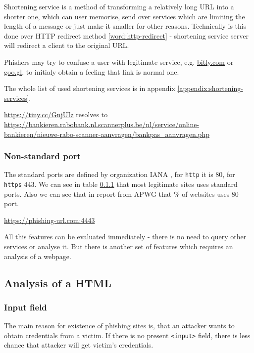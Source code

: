 \documentclass[
  digital, %
  oneside, %
  table,   %
  nolof,     %
  nolot,     %
]{fithesis3}
\newcounter{feature}
\newenvironment{feature}[1]{\stepcounter{feature}%
    \tcolorbox[beamer,%
    noparskip,breakable,
    colback=LightBlue,colframe=DarkBlue,%
    colbacklower=DarkBlue!75!LightBlue,%
    title=Feature~\thefeature: #1]}%
    {\endtcolorbox}
\begin{document}
Shortening service is a method of transforming a relatively long URL into a shorter one, which can user memorise, send over services which are limiting the length of a message or just make it smaller for other reasons. Technically is this done over HTTP redirect method \ref{word:http-redirect} - shortening service server will redirect a client to the original URL.

Phishers may try to confuse a user with legitimate service, e.g. \url{bitly.com} or \url{goo.gl}, to initialy obtain a feeling that link is normal one.

The whole list of used shortening services is in appendix \ref{appendix:shortening-services}.

\begin{feature}{Shortening service}
\url{https://tiny.cc/GnjUIz} \medbreak resolves to \\
\url{https://bankieren.rabobank.nl.scannerplus.be/nl/service/online-bankieren/nieuwe-rabo-scanner-aanvragen/bankpas_aanvragen.php}
\end{feature}

\subsubsection{Non-standard port \cite{fresh-phish}}

The standard ports are defined by organization IANA \cite{https://www.iana.org/assignments/service-names-port-numbers/service-names-port-numbers.txt}, for \texttt{http} it is 80, for \texttt{https} 443. We can see in table \ref{} that most legitimate sites uses standard ports. Also we can see that in report from APWG \cite{some-apwg} that \% of websites uses 80 port.

\begin{feature}{Non-standard port}
\url{https://phishing-url.com:4443}
\end{feature}

All this features can be evaluated immediately - there is no need to query other services or analyse it. But there is another set of features which requires an analysis of a webpage.



\subsection{Analysis of a HTML}

\subsubsection{Input field \cite{url-features-work} \cite{anomaly-based-detection} \cite{cantina} }
The main reason for existence of phishing sites is, that an attacker wants to obtain credentials from a victim. If there is no present \texttt{<input>} field, there is less chance that attacker will get victim's credentials.
\end{document}
